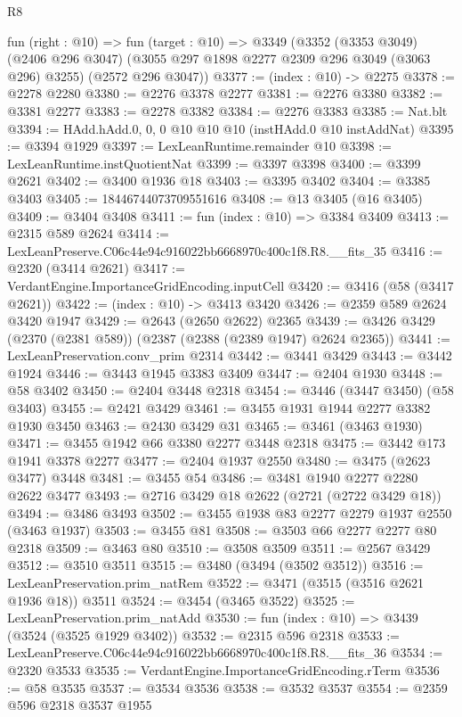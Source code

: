\begin{lexlean}{R8}
\begin{coremodule}
  fun (right : @10) =>
  fun (target : @10) =>
  @3349
    (@3352
      (@3353 @3049)
      (@2406 @296 @3047)
      (@3055 @297 @1898 @2277 @2309 @296 @3049 (@3063 @296) @3255)
      (@2572 @296 @3047))
@3377 := (index : @10) -> @2275
@3378 := @2278 @2280
@3380 := @2276 @3378 @2277
@3381 := @2276 @3380
@3382 := @3381 @2277
@3383 := @2278 @3382
@3384 := @2276 @3383
@3385 := Nat.blt
@3394 := HAdd.hAdd.{0, 0, 0} @10 @10 @10 (instHAdd.{0} @10 instAddNat)
@3395 := @3394 @1929
@3397 := LexLeanRuntime.remainder @10
@3398 := LexLeanRuntime.instQuotientNat
@3399 := @3397 @3398
@3400 := @3399 @2621
@3402 := @3400 @1936 @18
@3403 := @3395 @3402
@3404 := @3385 @3403
@3405 := 18446744073709551616
@3408 := @13 @3405 (@16 @3405)
@3409 := @3404 @3408
@3411 := fun (index : @10) => @3384 @3409
@3413 := @2315 @589 @2624
@3414 := LexLeanPreserve.C06c44e94c916022bb6668970c400c1f8.R8.__fits_35
@3416 := @2320 (@3414 @2621)
@3417 := VerdantEngine.ImportanceGridEncoding.inputCell
@3420 := @3416 (@58 (@3417 @2621))
@3422 := (index : @10) -> @3413 @3420
@3426 := @2359 @589 @2624 @3420 @1947
@3429 := @2643 (@2650 @2622) @2365
@3439 := @3426 @3429 (@2370 (@2381 @589)) (@2387 (@2388 (@2389 @1947) @2624 @2365))
@3441 := LexLeanPreservation.conv_prim @2314
@3442 := @3441 @3429
@3443 := @3442 @1924
@3446 := @3443 @1945 @3383 @3409
@3447 := @2404 @1930
@3448 := @58 @3402
@3450 := @2404 @3448 @2318
@3454 := @3446 (@3447 @3450) (@58 @3403)
@3455 := @2421 @3429
@3461 := @3455 @1931 @1944 @2277 @3382 @1930 @3450
@3463 := @2430 @3429 @31
@3465 := @3461 (@3463 @1930)
@3471 := @3455 @1942 @66 @3380 @2277 @3448 @2318
@3475 := @3442 @173 @1941 @3378 @2277
@3477 := @2404 @1937 @2550
@3480 := @3475 (@2623 @3477) @3448
@3481 := @3455 @54
@3486 := @3481 @1940 @2277 @2280 @2622 @3477
@3493 := @2716 @3429 @18 @2622 (@2721 (@2722 @3429 @18))
@3494 := @3486 @3493
@3502 := @3455 @1938 @83 @2277 @2279 @1937 @2550 (@3463 @1937)
@3503 := @3455 @81
@3508 := @3503 @66 @2277 @2277 @80 @2318
@3509 := @3463 @80
@3510 := @3508 @3509
@3511 := @2567 @3429
@3512 := @3510 @3511
@3515 := @3480 (@3494 (@3502 @3512))
@3516 := LexLeanPreservation.prim_natRem
@3522 := @3471 (@3515 (@3516 @2621 @1936 @18)) @3511
@3524 := @3454 (@3465 @3522)
@3525 := LexLeanPreservation.prim_natAdd
@3530 := fun (index : @10) => @3439 (@3524 (@3525 @1929 @3402))
@3532 := @2315 @596 @2318
@3533 := LexLeanPreserve.C06c44e94c916022bb6668970c400c1f8.R8.__fits_36
@3534 := @2320 @3533
@3535 := VerdantEngine.ImportanceGridEncoding.rTerm
@3536 := @58 @3535
@3537 := @3534 @3536
@3538 := @3532 @3537
@3554 := @2359
    @596
    @2318
    @3537
    @1955

\end{coremodule}
\end{lexlean}
